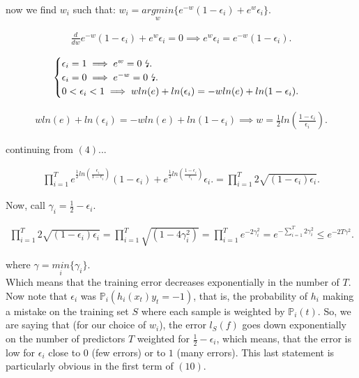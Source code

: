 \documentclass{article}
\begin{document}
now we find $w_i$ such that: $w_i = \underset{w}{argmin} \{ e^{-w}(1-\epsilon_i) + e^{w} \epsilon_i \}$.

\begin{align*}
\frac{d}{dw}e^{-w}(1-\epsilon_i) + e^{w} \epsilon_i = 0 \implies
e^{w}\epsilon_i = e^{-w}(1-\epsilon_i).
\end{align*}



\[
\begin{cases} 
\epsilon_i = 1 \implies e^{w} = 0 \text{ \lightning}.\\
\epsilon_i = 0 \implies e^{-w} = 0 \text{ \lightning}.\\
0 < \epsilon_i < 1  \implies  w ln(e) + ln(\epsilon_i) = -w ln(e) + ln(1-\epsilon_i).
\end{cases}
\]


\begin{align*}
w ln(e) + ln(\epsilon_i) = -w ln(e) + ln(1-\epsilon_i)\implies
w =  \frac{1}{2}ln(\frac{1-\epsilon_i}{\epsilon_i}).
\end{align*}

continuing from $(4)$... 

\begin{align*}
\prod_{i=1}^{T} e^{\frac{1}{2}ln(\frac{\epsilon_i}{1-\epsilon_i})} (1-\epsilon_i) + e^{\frac{1}{2}ln(\frac{1-\epsilon_i}{\epsilon_i})} \epsilon_i.
= \prod_{i=1}^{T} 2\sqrt{(1-\epsilon_i)\epsilon_i}.
\end{align*}

Now, call $\gamma_i = \frac{1}{2}-\epsilon_i$.

\begin{align*}
\prod_{i=1}^{T} 2\sqrt{(1-\epsilon_i)\epsilon_i} =
\prod_{i=1}^{T} \sqrt{(1-4\gamma_i^2)} = 
\prod_{i=1}^{T} e^{-2\gamma_i^{2}} = 
e^{-\sum_{i=1}^{T} 2\gamma_i^{2}} \leq
e^{-2T\gamma^2}.
\end{align*}

where $\gamma = \underset{i}{min} \{ \gamma_i \}$. \\

Which means that the training error decreases exponentially in the number of $T$.
Now note that $\epsilon_i$ was $\mathbb{P}_i(h_i(x_t) y_t = -1)$, 
that is, the probability of $h_i$ making a mistake on the training set $S$ 
where each sample is weighted by $\mathbb{P}_i(t)$. 
So, we are saying that (for our choice of $w_i$), the error $l_S(f)$ goes down exponentially on the number of predictors $T$
weighted for $\frac{1}{2}-\epsilon_i$, which means, that the error is low for $\epsilon_i$ close to $0$ (few errors) 
or to $1$ (many errors). This last
statement is particularly obvious in the first term of $(10)$.
\end{document}
